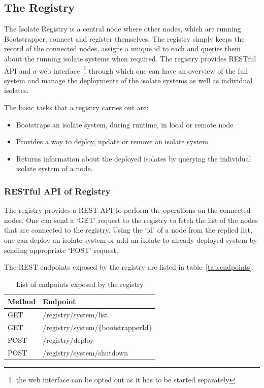 \subsection{The Registry}
\label{subsec:registry}
The Isolate Registry is a central node where other nodes, which are running Bootstrapper, connect and register themselves. The registry simply keeps the record of the connected nodes, assigns a unique id to each and queries them about the running isolate systems when required. The registry provides RESTful API and a web interface~\footnote{the web interface can be opted out as it has to be started separately} through which one can have an overview of the full system and manage the deployments of the isolate systems as well as individual isolates.

The basic tasks that a registry carries out are:
\begin{itemize}
  \item Bootstraps an isolate system, during runtime, in local or remote node
  \item Provides a way to deploy, update or remove an isolate system
  \item Returns information about the deployed isolates by querying the individual isolate system of a node.
\end{itemize}

  \subsubsection{RESTful API of Registry}
  \label{subsec:restApi}
  The registry provides a REST API to perform the operations on the connected nodes. One can send a ‘GET’ request to the registry to fetch the list of the nodes that are connected to the registry. Using the ‘id’ of a node from the replied list, one can deploy an isolate system or add an isolate to already deployed system by sending appropriate ‘POST’ request.

  The REST endpoints exposed by the registry are listed in table~\autoref{tab:endpoints}.
  \begin{table}[htsb]
    \caption[Endpoints exposed by the registry]{List of endpoints exposed by the registry}\label{tab:endpoints}
    \centering
    \begin{tabular}{l l}
      \toprule
        Method  & Endpoint \\
      \midrule
        GET &  /registry/system/list\\
        GET & /registry/system/\{bootstrapperId\} \\
        POST & /registry/deploy \\
        POST & /registry/system/shutdown \\
      \bottomrule
    \end{tabular}
  \end{table}

